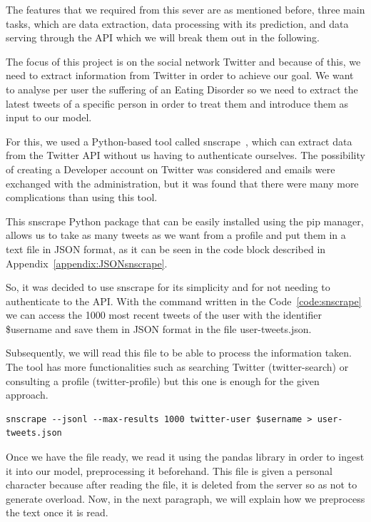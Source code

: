 The features that we required from this sever are as mentioned before, three main tasks, which are data extraction, data processing with its prediction, and data serving through the API which we will break them out in the following.

The focus of this project is on the social network Twitter and because of this, we need to extract information from Twitter in order to achieve our goal. We want to analyse per user the suffering of an Eating Disorder so we need to extract the latest tweets of a specific person in order to treat them and introduce them as input to our model.

For this, we used a Python-based tool called snscrape~\cite{JustAnot83:online}, which can extract data from the Twitter API without us having to authenticate ourselves. The possibility of creating a Developer account on Twitter was considered and emails were exchanged with the administration, but it was found that there were many more complications than using this tool. 

This snscrape Python package that can be easily installed using the pip manager, allows us to take as many tweets as we want from a profile and put them in a text file in JSON format, as it can be seen in the code block described in Appendix~\ref{appendix:JSONsnscrape}.

So, it was decided to use snscrape for its simplicity and for not needing to authenticate to the API. With the command written in the Code~\ref{code:snscrape} we can access the 1000 most recent tweets of the user with the identifier \$username and save them in JSON format in the file user-tweets.json.

Subsequently, we will read this file to be able to process the information taken. The tool has more functionalities such as searching Twitter (twitter-search) or consulting a profile (twitter-profile) but this one is enough for the given approach.

\begin{lstlisting}[caption={Command executed for obtaining tweets}, label={code:snscrape}]
snscrape --jsonl --max-results 1000 twitter-user $username > user-tweets.json
\end{lstlisting}

Once we have the file ready, we read it using the pandas library in order to ingest it into our model, preprocessing it beforehand. This file is given a personal character because after reading the file, it is deleted from the server so as not to generate overload. Now, in the next paragraph, we will explain how we preprocess the text once it is read.

